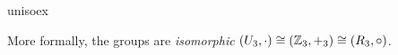 \begin{examples}{}{unisoex}
\begin{enumerate}
\[\]
More formally, the groups are \emph{isomorphic} $(U_3,\cdot)\cong (\mathbb{Z}_3,+_3)\cong (R_3,\circ)$.%
\end{enumerate}
\end{examples}

 
\clearpage

